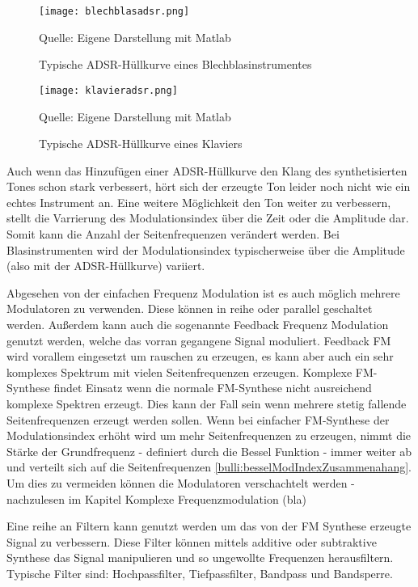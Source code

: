 \begin{figure} [ht]
\centering
  \texttt{[image: blechblasadsr.png]}
\caption{Typische ADSR-Hüllkurve eines Blechblasinstrumentes}
\label{fig:blechblasadsr}
Quelle: Eigene Darstellung mit Matlab
\end{figure}

\begin{figure} [ht]
\centering
  \texttt{[image: klavieradsr.png]}
\caption{Typische ADSR-Hüllkurve eines Klaviers}
\label{fig:klavieradsr}
Quelle: Eigene Darstellung mit Matlab
\end{figure}

Auch wenn das Hinzufügen einer ADSR-Hüllkurve den Klang des synthetisierten Tones schon stark verbessert, hört sich der erzeugte Ton leider noch nicht wie ein echtes Instrument an. Eine weitere Möglichkeit den Ton weiter zu verbessern, stellt die Varrierung des Modulationsindex über die Zeit oder die Amplitude dar. Somit kann die Anzahl der Seitenfrequenzen verändert werden. Bei Blasinstrumenten wird der Modulationsindex typischerweise über die Amplitude (also mit der ADSR-Hüllkurve) variiert. \cite[S. 532]{chowningPaper}

Abgesehen von der einfachen Frequenz Modulation ist es auch möglich mehrere Modulatoren zu verwenden. Diese können in reihe oder parallel geschaltet werden. Außerdem kann auch die sogenannte Feedback Frequenz Modulation genutzt werden, welche das vorran gegangene Signal moduliert. Feedback FM wird vorallem eingesetzt um rauschen zu erzeugen, es kann aber auch ein sehr komplexes Spektrum mit vielen Seitenfrequenzen erzeugen. Komplexe FM-Synthese findet Einsatz wenn die normale FM-Synthese nicht ausreichend komplexe Spektren erzeugt. Dies kann der Fall sein wenn mehrere stetig fallende Seitenfrequenzen erzeugt werden sollen. Wenn bei einfacher FM-Synthese der Modulationsindex erhöht wird um mehr Seitenfrequenzen zu erzeugen, nimmt die Stärke der Grundfrequenz - definiert durch die Bessel Funktion - immer weiter ab und verteilt sich auf die Seitenfrequenzen \ref{bulli:besselModIndexZusammenahang}. Um dies zu vermeiden können die Modulatoren verschachtelt werden - nachzulesen im Kapitel Komplexe Frequenzmodulation (bla)

Eine reihe an Filtern kann genutzt werden um das von der FM Synthese erzeugte Signal zu verbessern. Diese Filter können mittels additive oder subtraktive Synthese das Signal manipulieren und so ungewollte Frequenzen herausfiltern. Typische Filter sind: Hochpassfilter, Tiefpassfilter, Bandpass und Bandsperre. 



